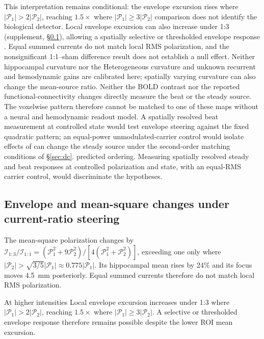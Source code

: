 \documentclass[11pt,a4paper]{article}
\newif\ifjne
\providecommand{\DIFaddtex}[1]{{\protect\color{blue} \sf #1}} %
\providecommand{\DIFdeltex}[1]{{\protect\color{red} \scriptsize #1}} %
\providecommand{\DIFaddbegin}{} %
\providecommand{\DIFaddend}{} %
\providecommand{\DIFdelbegin}{} %
\providecommand{\DIFdelend}{} %
\providecommand{\DIFadd}[1]{\texorpdfstring{\DIFaddtex{#1}}{#1}} %
\providecommand{\DIFdel}[1]{\texorpdfstring{\DIFdeltex{#1}}{}} %
\begin{document}
This \DIFdelbegin \DIFdel{interpretation remains conditional:
the envelope excursion rises where $|\mathcal P_1|>2|\mathcal P_2|$, reaching $1.5\times$ where $|\mathcal P_1|\geq3|\mathcal P_2|$}\DIFdelend \DIFaddbegin \DIFadd{comparison does not identify the biological detector. Local envelope excursion can also increase under 1:3
(supplement, \S\ref{supp:steering-algebra})}\DIFaddend , allowing a \DIFdelbegin \DIFdel{spatially }\DIFdelend selective or
thresholded envelope response\DIFaddbegin \DIFadd{. Equal summed currents do not match local RMS polarization}\DIFaddend ,
and the nonsignificant 1:1--sham \DIFdelbegin \DIFdel{difference
}\DIFdelend \DIFaddbegin \DIFadd{result }\DIFaddend does not establish a null effect.
\DIFdelbegin \DIFdel{Neither hippocampal curvature nor the
}\DIFdelend \DIFaddbegin \DIFadd{Heterogeneous curvature and unknown }\DIFaddend recurrent and hemodynamic gains \DIFdelbegin \DIFdel{are calibrated here; spatially varying
curvature can also change
the mean-source ratio. Neither the BOLD contrast
nor the reported functional-connectivity changes directly measure the beat or the steady source.
The voxelwise pattern therefore cannot be matched to
one of these maps without a neural and hemodynamic readout model. A spatially resolved beat measurement at controlled state would
test envelope
steering against the fixed quadratic pattern; an equal-power
unmodulated-carrier control would isolate effects of }\DIFdelend \DIFaddbegin \DIFadd{can change
}\DIFaddend the \DIFdelbegin \DIFdel{steady source under
the
second-order matching conditions of \S\ref{sec:dc}.
}\DIFdelend \DIFaddbegin \DIFadd{predicted ordering. Measuring spatially resolved steady and beat responses
at controlled polarization and state, with an equal-RMS carrier control,
would discriminate the hypotheses.
}\ifjne\else
\subsection{\DIFadd{Envelope and mean-square changes under current-ratio steering}}\label{supp:steering-algebra}
\DIFadd{The mean-square polarization
changes by $\mathcal I_{1:3}/\mathcal I_{1:1}
=(\mathcal P_1^2+9\mathcal P_2^2)/[4(\mathcal P_1^2+\mathcal P_2^2)]$,
exceeding one only where $|\mathcal P_2|>\sqrt{3/5}|\mathcal P_1|
\approx0.775|\mathcal P_1|$. Its hippocampal mean rises by 24\% and its focus
moves 4.5~mm posteriorly. Equal summed currents therefore do not match local
RMS polarization.
}\DIFaddend

\DIFdelbegin \DIFdel{At higher intensities}\DIFdelend \DIFaddbegin \DIFadd{Local envelope excursion increases under 1:3 where
$|\mathcal P_1|>2|\mathcal P_2|$, reaching $1.5\times$ where
$|\mathcal P_1|\geq3|\mathcal P_2|$. A selective or thresholded envelope
response therefore remains possible despite the lower ROI mean excursion.
}
\end{document}
